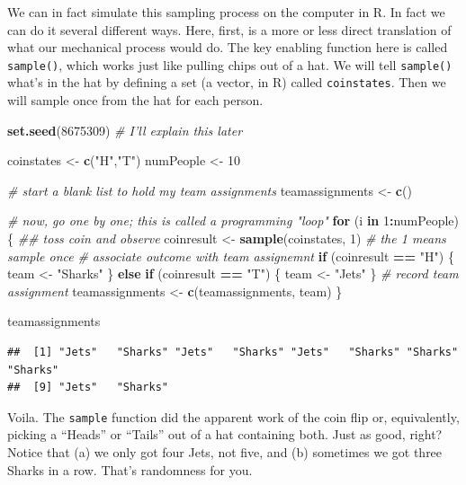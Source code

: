 \documentclass[openany]{book}
\newenvironment{Shaded}{\begin{snugshade}}{\end{snugshade}}
\newcommand{\CommentTok}[1]{\textcolor[rgb]{0.56,0.35,0.01}{\textit{#1}}}
\newcommand{\ControlFlowTok}[1]{\textcolor[rgb]{0.13,0.29,0.53}{\textbf{#1}}}
\newcommand{\DecValTok}[1]{\textcolor[rgb]{0.00,0.00,0.81}{#1}}
\newcommand{\KeywordTok}[1]{\textcolor[rgb]{0.13,0.29,0.53}{\textbf{#1}}}
\newcommand{\NormalTok}[1]{#1}
\newcommand{\OperatorTok}[1]{\textcolor[rgb]{0.81,0.36,0.00}{\textbf{#1}}}
\newcommand{\StringTok}[1]{\textcolor[rgb]{0.31,0.60,0.02}{#1}}
\begin{document}
We can in fact simulate this sampling process on the computer in R. In fact we can do it several different ways. Here, first, is a more or less direct translation of what our mechanical process would do. The key enabling function here is called \texttt{sample()}, which works just like pulling chips out of a hat. We will tell \texttt{sample()} what's in the hat by defining a set (a vector, in R) called \texttt{coinstates}. Then we will sample once from the hat for each person.

\begin{Shaded}
\begin{Highlighting}[]
\KeywordTok{set.seed}\NormalTok{(}\DecValTok{8675309}\NormalTok{) }\CommentTok{# I'll explain this later }

\NormalTok{coinstates <-}\StringTok{ }\KeywordTok{c}\NormalTok{(}\StringTok{"H"}\NormalTok{,}\StringTok{"T"}\NormalTok{)}
\NormalTok{numPeople <-}\StringTok{ }\DecValTok{10}

\CommentTok{# start a blank list to hold my team assignments}
\NormalTok{teamassignments <-}\StringTok{ }\KeywordTok{c}\NormalTok{()}

\CommentTok{# now, go one by one; this is called a programming "loop"}
\ControlFlowTok{for}\NormalTok{ (i }\ControlFlowTok{in} \DecValTok{1}\OperatorTok{:}\NormalTok{numPeople) \{}
  \CommentTok{## toss coin and observe}
\NormalTok{  coinresult <-}\StringTok{ }\KeywordTok{sample}\NormalTok{(coinstates, }\DecValTok{1}\NormalTok{) }\CommentTok{# the 1 means sample once}
  \CommentTok{# associate outcome with team assignemnt}
  \ControlFlowTok{if}\NormalTok{ (coinresult }\OperatorTok{==}\StringTok{ "H"}\NormalTok{) \{}
\NormalTok{    team <-}\StringTok{ "Sharks"}
\NormalTok{  \} }\ControlFlowTok{else} \ControlFlowTok{if}\NormalTok{ (coinresult }\OperatorTok{==}\StringTok{ "T"}\NormalTok{) \{}
\NormalTok{    team <-}\StringTok{ "Jets"}
\NormalTok{  \}}
  \CommentTok{# record team assignment}
\NormalTok{  teamassignments <-}\StringTok{ }\KeywordTok{c}\NormalTok{(teamassignments, team)}
\NormalTok{\}}

\NormalTok{teamassignments}
\end{Highlighting}
\end{Shaded}

\begin{verbatim}
##  [1] "Jets"   "Sharks" "Jets"   "Sharks" "Jets"   "Sharks" "Sharks" "Sharks"
##  [9] "Jets"   "Sharks"
\end{verbatim}

Voila. The \texttt{sample} function did the apparent work of the coin flip or, equivalently, picking a ``Heads'' or ``Tails'' out of a hat containing both. Just as good, right? Notice that (a) we only got four Jets, not five, and (b) sometimes we got three Sharks in a row. That's randomness for you.
\end{document}
